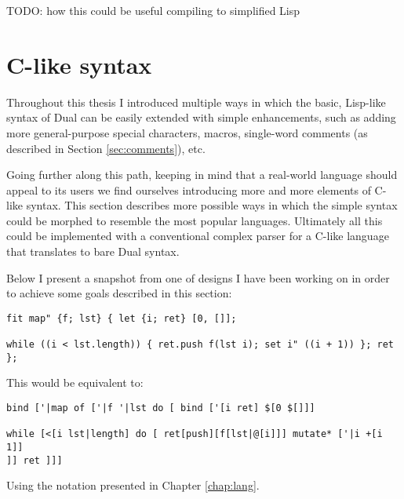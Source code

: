 TODO: how this could be useful compiling to simplified Lisp

\section{C-like syntax}
Throughout this thesis I introduced multiple ways in which the basic, Lisp-like
syntax of Dual can be easily extended with simple enhancements, such as adding
more general-purpose special characters, macros, single-word comments (as
described in Section \ref{sec:comments}), etc.

Going further along this path, keeping in mind that a real-world language should
appeal to its users we find ourselves introducing more and more elements of
C-like syntax. This section describes more possible ways in which the simple
syntax could be morphed to resemble the most popular languages.  Ultimately all
this could be implemented with a conventional complex parser for a C-like
language that translates to bare Dual syntax.

Below I present a snapshot from one of designs I have been working on in order
to achieve some goals described in this section:
\begin{lstlisting}
fit map" {f; lst} { let {i; ret} [0, []];

while ((i < lst.length)) { ret.push f(lst i); set i" ((i + 1)) }; ret };
\end{lstlisting}

This would be equivalent to:
\begin{lstlisting}
bind ['|map of ['|f '|lst do [ bind ['[i ret] $[0 $[]]]

while [<[i lst|length] do [ ret[push][f[lst|@[i]]] mutate* ['|i +[i 1]]
]] ret ]]]
\end{lstlisting}

Using the notation presented in Chapter \ref{chap:lang}.

